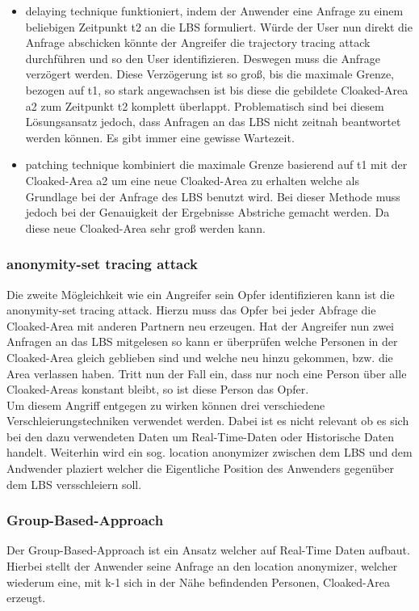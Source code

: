 \begin{itemize}

\item{delaying technique} funktioniert, indem der Anwender eine Anfrage zu einem beliebigen Zeitpunkt t2 an die LBS formuliert. Würde der User nun direkt die Anfrage abschicken könnte der Angreifer die trajectory tracing attack durchführen und so den User identifizieren. Deswegen muss die Anfrage verzögert werden. Diese Verzögerung ist so groß, bis die maximale Grenze, bezogen auf t1, so stark angewachsen ist bis diese die gebildete Cloaked-Area a2 zum Zeitpunkt t2 komplett überlappt. Problematisch sind bei diesem Lösungsansatz jedoch, dass Anfragen an das LBS nicht zeitnah beantwortet werden können. Es gibt immer eine gewisse Wartezeit.
\item{patching technique} kombiniert die maximale Grenze basierend auf t1 mit der Cloaked-Area a2 um eine neue Cloaked-Area zu erhalten welche als Grundlage bei der Anfrage des LBS benutzt wird. Bei dieser Methode muss jedoch bei der Genauigkeit der Ergebnisse Abstriche gemacht werden. Da diese neue Cloaked-Area sehr groß werden kann. 
\end{itemize}
\subsubsection{anonymity-set tracing attack}
Die zweite Mögleichkeit wie ein Angreifer sein Opfer identifizieren kann ist die anonymity-set tracing attack. Hierzu muss das Opfer bei jeder Abfrage die Cloaked-Area mit anderen Partnern neu erzeugen. Hat der Angreifer nun zwei Anfragen an das LBS mitgelesen so kann er überprüfen welche Personen in der Cloaked-Area gleich geblieben sind und welche neu hinzu gekommen, bzw. die Area verlassen haben. Tritt nun der Fall ein, dass nur noch eine Person über alle Cloaked-Areas konstant bleibt, so ist diese Person das Opfer.\\
Um diesem Angriff entgegen zu wirken können drei verschiedene Verschleierungstechniken verwendet werden. Dabei ist es nicht relevant ob es sich bei den dazu verwendeten Daten um Real-Time-Daten oder Historische Daten handelt. Weiterhin wird ein sog. location anonymizer zwischen dem LBS und dem Andwender plaziert welcher die Eigentliche Position des Anwenders gegenüber dem LBS versschleiern soll.
\subsubsection{Group-Based-Approach}
Der Group-Based-Approach ist ein Ansatz welcher auf Real-Time Daten aufbaut. Hierbei stellt der Anwender seine Anfrage an den location anonymizer, welcher wiederum eine, mit k-1 sich in der Nähe befindenden Personen, Cloaked-Area erzeugt.  